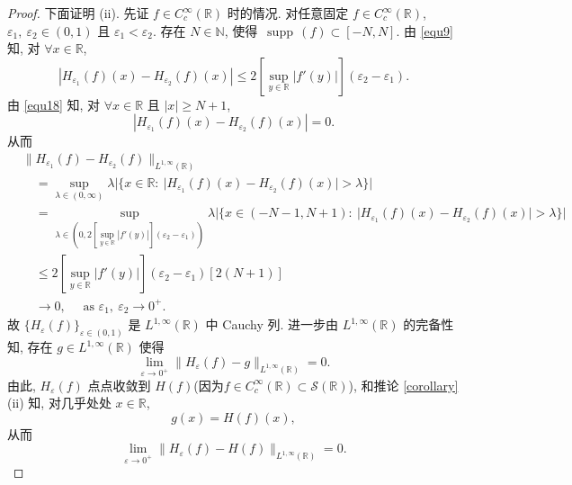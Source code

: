 \documentclass[a4paper,11pt]{article}
\theoremstyle{definition}
\def \supp {\mathop\mathrm{\,supp\,}}
\begin{document}
\begin{CJK*}{UTF8}{gbsn}
\begin{proof}
    
    下面证明 (ii). 
    先证 $ f \in C_c^\infty(\mathbb{R}) $ 时的情况.
    对任意固定 $ f \in C_c^\infty(\mathbb{R}) $, 
    $ \varepsilon_1, \ \varepsilon_2 \in (0, 1) $ 且 $ \varepsilon_1 < \varepsilon_2 $.
    存在 $ N \in \mathbb{N} $, 使得 $ \supp(f) \subset [-N, N] $. 
    由 \eqref{equ9} 知, 对 $ \forall x \in \mathbb{R} $, 
    $$
        |H_{\varepsilon_1} (f)(x) - H_{\varepsilon_2} (f)(x)|
            \leq 2 \left[ \sup_{y \in \mathbb{R}} |f'(y)| \right]  (\varepsilon_2 - \varepsilon_1). 
    $$
    由 \eqref{equ18} 知, 对 $ \forall x \in \mathbb{R} $ 且 $ |x| \geq N + 1 $,
    $$
        |H_{\varepsilon_1} (f)(x) - H_{\varepsilon_2} (f)(x)| = 0.
    $$
    从而
    \begin{align*}
        &\| H_{\varepsilon_1} (f) - H_{\varepsilon_2} (f)  \|_{L^{1, \infty}(\mathbb{R})} \\
            &\quad= \sup_{\lambda \in (0, \infty)} 
              \lambda |\{ x \in \mathbb{R} :\ |H_{\varepsilon_1} (f)(x) - H_{\varepsilon_2} (f)(x)| > \lambda \}| \\
            &\quad= \sup_{\lambda \in (0, 2 [\sup_{y \in \mathbb{R}} |f'(y)|] (\varepsilon_2 - \varepsilon_1))} 
              \lambda |\{ x \in (-N-1, N+1) :\ |H_{\varepsilon_1} (f)(x) - H_{\varepsilon_2} (f)(x)| > \lambda \}| \\
            &\quad\leq 2 \left[ \sup_{y \in \mathbb{R}} |f'(y)| \right]  (\varepsilon_2 - \varepsilon_1) [2 (N+1)] \\
            &\quad\to 0, \quad \text{ as } \varepsilon_1, \ \varepsilon_2 \to 0^+.
    \end{align*}
    故 $ \{ H_\varepsilon (f) \}_{\varepsilon \in (0, 1)} $ 是 $ L^{1, \infty}(\mathbb{R}) $ 中 Cauchy 列.  
    进一步由 $ L^{1, \infty}(\mathbb{R}) $ 的完备性知, 存在 $ g \in L^{1, \infty}(\mathbb{R}) $ 使得
    $$ 
        \lim_{\varepsilon \to 0^+} \| H_\varepsilon (f) - g \|_{L^{1, \infty}(\mathbb{R})} = 0.
    $$
    由此, $ H_\varepsilon (f) $ 点点收敛到 $ H (f) $(因为$f \in C_c^\infty(\mathbb{R}) \subset \mathcal{S}(\mathbb{R})$),
    和推论 \ref{corollary}(ii) 知, 对几乎处处 $ x \in \mathbb{R} $,
    $$
        g(x) = H (f)(x),
    $$
    从而
    \begin{equation} \label{equ10}
         \lim_{\varepsilon \to 0^+} \| H_\varepsilon (f) - H (f) \|_{L^{1, \infty}(\mathbb{R})} = 0.
    \end{equation}
    

\end{proof}
\end{CJK*}
\end{document}
